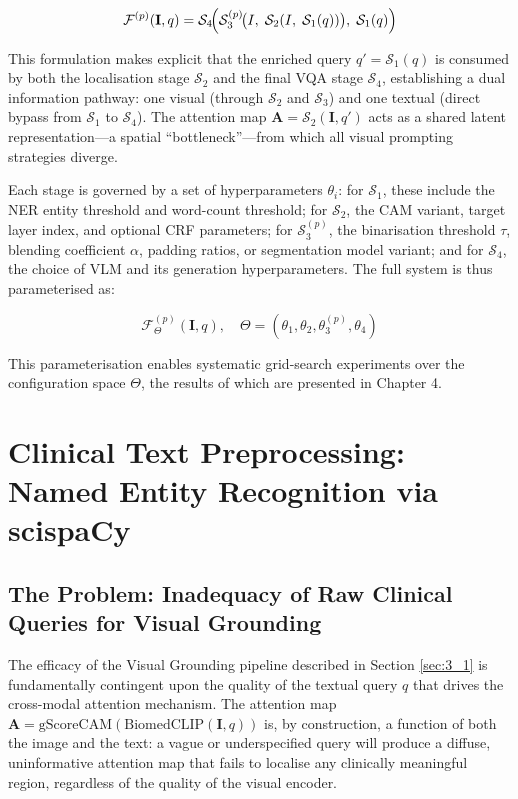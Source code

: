 \[
\mathcal{F}^{(p)}(\mathbf{I}, q) = \mathcal{S}_4\!\Bigl(\mathcal{S}_3^{(p)}\!\bigl(I,\; \mathcal{S}_2(I,\; \mathcal{S}_1(q))\bigr),\; \mathcal{S}_1(q)\Bigr)
\]

This formulation makes explicit that the enriched query $q' = \mathcal{S}_1(q)$ is consumed by both the localisation stage $\mathcal{S}_2$ and the final VQA stage $\mathcal{S}_4$, establishing a dual information pathway: one visual (through $\mathcal{S}_2$ and $\mathcal{S}_3$) and one textual (direct bypass from $\mathcal{S}_1$ to $\mathcal{S}_4$). The attention map $\mathbf{A} = \mathcal{S}_2(\mathbf{I}, q')$ acts as a shared latent representation—a spatial ``bottleneck''—from which all visual prompting strategies diverge.

Each stage is governed by a set of hyperparameters $\theta_i$: for $\mathcal{S}_1$, these include the NER entity threshold and word-count threshold; for $\mathcal{S}_2$, the CAM variant, target layer index, and optional CRF parameters; for $\mathcal{S}_3^{(p)}$, the binarisation threshold $\tau$, blending coefficient $\alpha$, padding ratios, or segmentation model variant; and for $\mathcal{S}_4$, the choice of VLM and its generation hyperparameters. The full system is thus parameterised as:

\[
\mathcal{F}^{(p)}_{\Theta}(\mathbf{I}, q), \quad \Theta = (\theta_1, \theta_2, \theta_3^{(p)}, \theta_4)
\]

This parameterisation enables systematic grid-search experiments over the configuration space $\Theta$, the results of which are presented in Chapter 4.

\section{Clinical Text Preprocessing: Named Entity Recognition via scispaCy}
\label{sec:3_2}

\subsection{The Problem: Inadequacy of Raw Clinical Queries for Visual Grounding}
\label{sec:3_2_1}

The efficacy of the Visual Grounding pipeline described in Section \ref{sec:3_1} is fundamentally contingent upon the quality of the textual query $q$ that drives the cross-modal attention mechanism. The attention map 
$\mathbf{A} = \text{gScoreCAM}(\text{BiomedCLIP}(\mathbf{I}, q))$ is, by construction, a function of both the image and the text: a vague or underspecified query will produce a diffuse, uninformative attention map that fails to localise any clinically meaningful region, regardless of the quality of the visual encoder.


